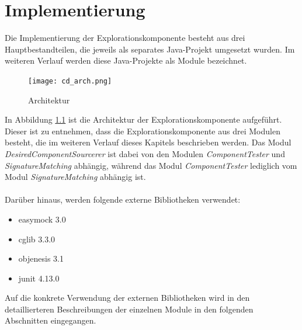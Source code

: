 \chapter{Implementierung}\label{chap_impl}
Die Implementierung der Explorationskomponente besteht aus drei Hauptbestandteilen, die jeweils als separates Java-Projekt umgesetzt wurden. Im weiteren Verlauf werden diese Java-Projekte als Module bezeichnet.
\begin{figure}[h!]
\centering
\texttt{[image: cd\_arch.png]}
\caption{Architektur}
\label{cd_arch}
\end{figure}
\noindent
In Abbildung \ref{cd_arch} ist die Architektur der Explorationskomponente aufgeführt. Dieser ist zu entnehmen, dass die Explorationskomponente aus drei Modulen besteht, die im weiteren Verlauf dieses Kapitels beschrieben werden. Das Modul \emph{DesiredComponentSourcerer} ist dabei von den Modulen \emph{ComponentTester} und \emph{SignatureMatching} abhängig, während das Modul \emph{ComponentTester} lediglich vom Modul \emph{SignatureMatching} abhängig ist.
\\\\
Darüber hinaus, werden folgende externe Bibliotheken verwendet:
\begin{itemize}
\item easymock 3.0 \cite{easymock}
\item cglib 3.3.0 \cite{cglib}
\item objenesis 3.1 \cite{objenesis}
\item junit 4.13.0 \cite{junit}
\end{itemize}
Auf die konkrete Verwendung der externen Bibliotheken wird in den detaillierteren Beschreibungen der einzelnen Module in den folgenden Abschnitten eingegangen.

